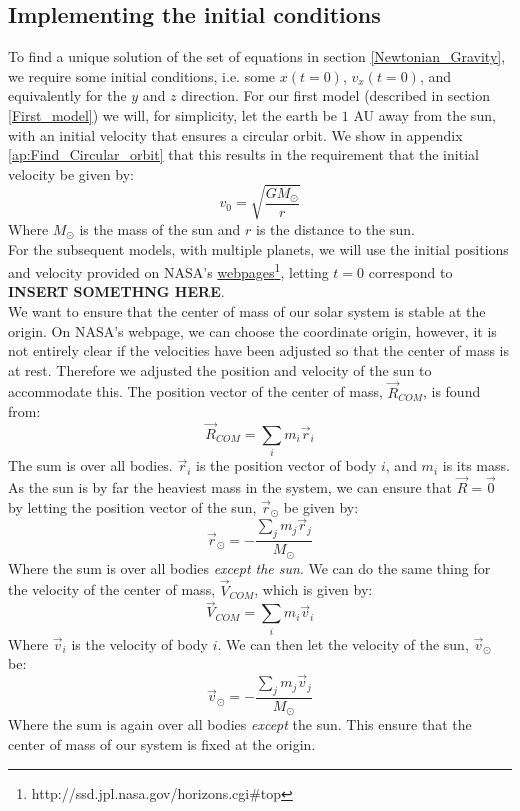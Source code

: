 \documentclass[a4paper, 10pt]{article}
\begin{document}
\subsection{Implementing the initial conditions}\label{implement_IC}
To find a unique solution of the set of equations in section \ref{Newtonian_Gravity}, we require some initial conditions, i.e. some $x(t=0)$, $v_x(t=0)$, and equivalently for the $y$ and $z$ direction. For our first model (described in section \ref{First_model}) we will, for simplicity, let the earth be $1$ AU away from the sun, with an initial velocity that ensures a circular orbit. We show in appendix \ref{ap:Find_Circular_orbit} that this results in the requirement that the initial velocity be given by:
\begin{equation}
v_0=\sqrt{\frac{GM_{\odot}}{r}}
\end{equation}
Where $M_{\odot}$ is the mass of the sun and $r$ is the distance to the sun.\\
\linebreak
For the subsequent models, with multiple planets, we will use the initial positions and velocity provided on NASA's \href{http://ssd.jpl.nasa.gov/horizons.cgi#top}{webpages}\footnote{http://ssd.jpl.nasa.gov/horizons.cgi\#top}, letting $t=0$ correspond to \textbf{INSERT SOMETHNG HERE}.\\
\linebreak
We want to ensure that the center of mass of our solar system is stable at the origin. On NASA's webpage, we can choose the coordinate origin, however, it is not entirely clear if the velocities have been adjusted so that the center of mass is at rest. Therefore we adjusted the position and velocity of the sun to accommodate this. The position vector of the center of mass, $\vec{R}_{COM}$, is found from:
$$\vec{R}_{COM}=\sum_i m_i\vec{r}_i$$
The sum is over all bodies. $\vec{r}_i$ is the position vector of body $i$,  and $m_i$ is its mass. As the sun is by far the heaviest mass in the system, we can ensure that $\vec{R}=\vec{0}$ by letting the position vector of the sun, $\vec{r}_{\odot}$ be given by:
$$\vec{r}_{\odot}=-\frac{\sum_j m_j\vec{r}_j}{M_{\odot}}$$
Where the sum is over all bodies \textit{except the sun}. We can do the same thing for the velocity of the center of mass, $\vec{V}_{COM}$, which is given by:
$$\vec{V}_{COM}=\sum_i m_i \vec{v}_i$$
Where $\vec{v}_i$ is the velocity of body $i$. We can then let the velocity of the sun, $\vec{v}_{\odot}$ be:
$$\vec{v}_{\odot}=-\frac{\sum_j m_j\vec{v}_j}{M_{\odot}}$$
Where the sum is again over all bodies \textit{except} the sun. This ensure that the center of mass of our system is fixed at the origin.
\end{document}
